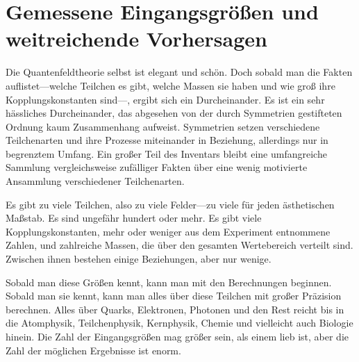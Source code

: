 \begin{classroomqa}
\end{classroomqa}

\section{Gemessene Eingangsgrößen und weitreichende Vorhersagen}

Die Quantenfeldtheorie selbst ist elegant und schön. Doch sobald man die Fakten auflistet---welche Teilchen es gibt, welche Massen sie haben und wie groß ihre Kopplungskonstanten sind---, ergibt sich ein Durcheinander. Es ist ein sehr hässliches Durcheinander, das abgesehen von der durch Symmetrien gestifteten Ordnung kaum Zusammenhang aufweist. Symmetrien setzen verschiedene Teilchenarten und ihre Prozesse miteinander in Beziehung, allerdings nur in begrenztem Umfang. Ein großer Teil des Inventars bleibt eine umfangreiche Sammlung vergleichsweise zufälliger Fakten über eine wenig motivierte Ansammlung verschiedener Teilchenarten.

\begin{classroomqa}
\end{classroomqa}

Es gibt zu viele Teilchen, also zu viele Felder---zu viele für jeden ästhetischen Maßstab. Es sind ungefähr hundert oder mehr. Es gibt viele Kopplungskonstanten, mehr oder weniger aus dem Experiment entnommene Zahlen, und zahlreiche Massen, die über den gesamten Wertebereich verteilt sind. Zwischen ihnen bestehen einige Beziehungen, aber nur wenige.

Sobald man diese Größen kennt, kann man mit den Berechnungen beginnen. Sobald man sie kennt, kann man alles über diese Teilchen mit großer Präzision berechnen. Alles über Quarks, Elektronen, Photonen und den Rest reicht bis in die Atomphysik, Teilchenphysik, Kernphysik, Chemie und vielleicht auch Biologie hinein. Die Zahl der Eingangsgrößen mag größer sein, als einem lieb ist, aber die Zahl der möglichen Ergebnisse ist enorm.

